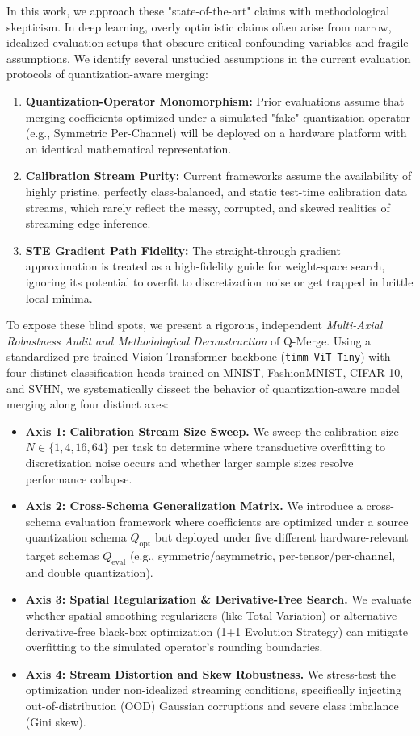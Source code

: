 In this work, we approach these "state-of-the-art" claims with methodological skepticism. In deep learning, overly optimistic claims often arise from narrow, idealized evaluation setups that obscure critical confounding variables and fragile assumptions. We identify several unstudied assumptions in the current evaluation protocols of quantization-aware merging:
\begin{enumerate}
    \item \textbf{Quantization-Operator Monomorphism:} Prior evaluations assume that merging coefficients optimized under a simulated "fake" quantization operator (e.g., Symmetric Per-Channel) will be deployed on a hardware platform with an identical mathematical representation.
    \item \textbf{Calibration Stream Purity:} Current frameworks assume the availability of highly pristine, perfectly class-balanced, and static test-time calibration data streams, which rarely reflect the messy, corrupted, and skewed realities of streaming edge inference.
    \item \textbf{STE Gradient Path Fidelity:} The straight-through gradient approximation is treated as a high-fidelity guide for weight-space search, ignoring its potential to overfit to discretization noise or get trapped in brittle local minima.
\end{enumerate}

To expose these blind spots, we present a rigorous, independent \emph{Multi-Axial Robustness Audit and Methodological Deconstruction} of Q-Merge. Using a standardized pre-trained Vision Transformer backbone (\texttt{timm ViT-Tiny}) \cite{dosovitskiy2020vit} with four distinct classification heads trained on MNIST, FashionMNIST, CIFAR-10, and SVHN, we systematically dissect the behavior of quantization-aware model merging along four distinct axes:
\begin{itemize}
    \item \textbf{Axis 1: Calibration Stream Size Sweep.} We sweep the calibration size $N \in \{1, 4, 16, 64\}$ per task to determine where transductive overfitting to discretization noise occurs and whether larger sample sizes resolve performance collapse.
    \item \textbf{Axis 2: Cross-Schema Generalization Matrix.} We introduce a cross-schema evaluation framework where coefficients are optimized under a source quantization schema $Q_{\text{opt}}$ but deployed under five different hardware-relevant target schemas $Q_{\text{eval}}$ (e.g., symmetric/asymmetric, per-tensor/per-channel, and double quantization).
    \item \textbf{Axis 3: Spatial Regularization \& Derivative-Free Search.} We evaluate whether spatial smoothing regularizers (like Total Variation) or alternative derivative-free black-box optimization (1+1 Evolution Strategy) can mitigate overfitting to the simulated operator's rounding boundaries.
    \item \textbf{Axis 4: Stream Distortion and Skew Robustness.} We stress-test the optimization under non-idealized streaming conditions, specifically injecting out-of-distribution (OOD) Gaussian corruptions and severe class imbalance (Gini skew).
\end{itemize}


